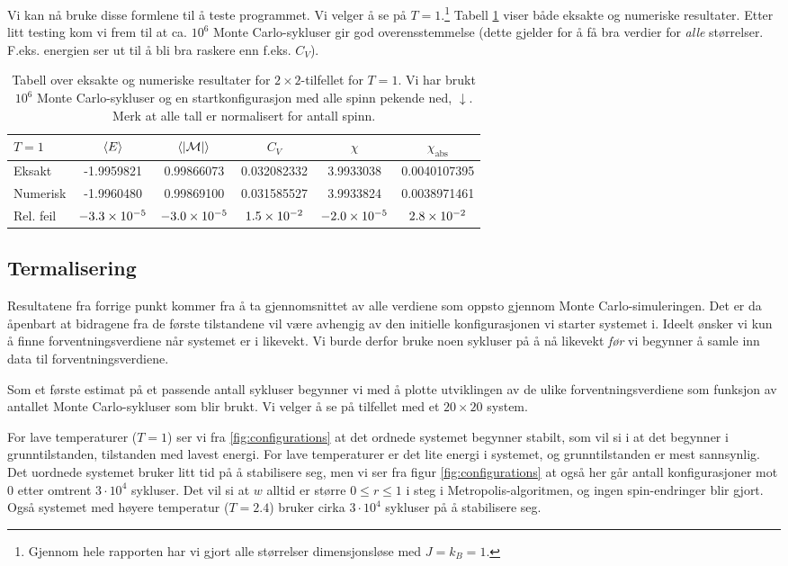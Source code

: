 \documentclass[11pt]{article}
\newcommand{\abs}[1]{|#1|}
\begin{document}
Vi kan nå bruke disse formlene til å teste programmet. Vi velger å se
på $T=1$.\footnote{Gjennom hele rapporten har vi gjort alle
  størrelser dimensjonsløse med $J=k_B=1$.} Tabell \ref{tab:2x2-eksakt-num} viser både eksakte og
numeriske resultater. Etter litt testing kom vi frem til at ca. $10^6$
Monte Carlo-sykluser gir god overensstemmelse (dette gjelder for å få
bra verdier for \textit{alle} størrelser. F.eks. energien ser ut til å bli bra
raskere enn f.eks. $C_V$).


\begin{table}
\centering
\caption{Tabell over eksakte og numeriske resultater for $2\times
  2$-tilfellet for $T=1$. Vi har brukt $10^6$ Monte Carlo-sykluser og
  en startkonfigurasjon med alle spinn pekende ned, $\downarrow$. Merk at
alle tall er normalisert for antall spinn.}
\label{tab:2x2-eksakt-num}
\vspace{0.1cm}
\begin{tabular}{l|ccccc}
$T=1$ & $\langle E \rangle$ & $\mean{ \abs{\mathcal{M} } }$ & $C_V$ & $\chi$ & $\chi_\text{abs}$ \\
\hline
Eksakt & -1.9959821 & 0.99866073 & 0.032082332 & 3.9933038 & 0.0040107395 \\
Numerisk & -1.9960480 & 0.99869100 & 0.031585527 & 3.9933824 & 0.0038971461 \\
Rel. feil & $-3.3\times 10^{-5}$ & $-3.0\times 10^{-5}$ & $1.5\times 10^{-2}$  & $-2.0\times 10^{-5}$ & $2.8\times 10^{-2}$ 
\end{tabular}
\end{table}



\subsection{Termalisering}
Resultatene fra forrige punkt kommer fra å ta gjennomsnittet av alle
verdiene som oppsto gjennom Monte Carlo-simuleringen. Det er da
åpenbart at bidragene fra de første tilstandene vil være avhengig av
den initielle konfigurasjonen vi starter systemet i. Ideelt ønsker vi
kun å finne forventningsverdiene når systemet er i likevekt. Vi burde
derfor bruke noen sykluser på å nå likevekt \textit{før} vi
begynner å samle inn data til forventningsverdiene. 

Som et første estimat på et passende antall sykluser begynner vi med å
plotte utviklingen av de ulike forventningsverdiene som funksjon av
antallet Monte Carlo-sykluser som blir brukt. Vi velger å se på
tilfellet med et $20\times 20$ system. 

For lave temperaturer ($T = 1$) ser vi fra \ref{fig:configurations} at det ordnede systemet
begynner stabilt, som vil si i at det begynner i grunntilstanden,
tilstanden med lavest energi. For lave temperaturer er det lite energi
i systemet, og grunntilstanden er mest sannsynlig. Det uordnede 
systemet bruker litt tid på å stabilisere seg, men vi ser fra
figur \ref{fig:configurations} at også her går antall konfigurasjoner mot 0
etter omtrent $3 \cdot 10^4$ sykluser. Det vil si at $w$ alltid er
større $0\leq r\leq 1$ i steg \label{steg6} i Metropolis-algoritmen,
og ingen spin-endringer blir gjort. Også systemet med høyere
temperatur ($T=2.4$) bruker cirka $3 \cdot 10^4$ sykluser på å
stabilisere seg.
\end{document}
